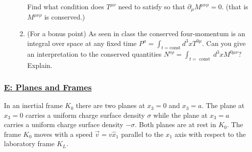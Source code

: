 \begin{enumerate}
\begin{enumerate}
		Find what condition does $T^{\mu \nu}$ need to satisfy so that $\partial_{\mu} M^{\mu \nu \rho}=0$. (that is $M^{\mu \nu \rho}$ is conserved.)
		\item (For a bonus point) As seen in class the conserved four-momentum is an integral over space at any fixed time $P^{\mu}=\int_{t=\mathrm{const}} d^{3} x T^{0 \mu} .$ Can you give an interpretation to the conserved quantities $N^{\nu \rho}=\int_{t=\text { const }} d^{3} x M^{0 \mu \nu} ?$ Explain.
	\end{enumerate}
\end{enumerate}

\subsubsection{\hyperref[E: Planes and Frames]{E: Planes and Frames}}

In an inertial frame $K_{0}$ there are two planes at $x_{3}=0$ and $x_{3}=a .$ The plane at $x_{3}=0$ carries a uniform charge surface density $\sigma$ while the plane at $x_{3}=a$ carries a uniform charge surface density $-\sigma .$ Both planes are at rest in $K_{0}$. The frame $K_{0}$ moves with a speed $\vec{v}=v \hat{x}_{1}$ parallel to the $x_{1}$ axis with respect to the laboratory frame $K_{L}$.

